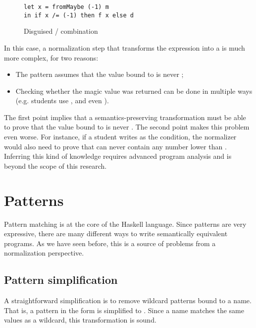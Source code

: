 \begin{figure}
\centering
\begin{verbatim}
let x = fromMaybe (-1) m
in if x /= (-1) then f x else d
\end{verbatim}
\caption{Disguised  /  combination}
\label{fig:maybe-isjust-fromjust-disguised}
\end{figure}

In this case, a normalization step that transforms the expression into a  is much more complex, for two reasons:

\begin{itemize}
    \item The pattern assumes that the value bound to  is never ;
    \item Checking whether the magic value was returned can be done in multiple ways (e.g. students use \haskell{(==)}, \haskell{(/=)} and even \haskell{(>)}).
\end{itemize}

The first point implies that a semantics-preserving transformation must be able to prove that the value bound to  is never . The second point makes this problem even worse. For instance, if a student writes  as the  condition, the normalizer would also need to prove that  can never contain any number lower than . Inferring this kind of knowledge requires advanced program analysis and is beyond the scope of this research.

\section{Patterns}

Pattern matching is at the core of the Haskell language. Since patterns are very expressive, there are many different ways to write semantically equivalent programs. As we have seen before, this is a source of problems from a normalization perspective.

\subsection{Pattern simplification}

A straightforward simplification is to remove wildcard patterns bound to a name. That is, a pattern in the form  is simplified to . Since a name matches the same values as a wildcard, this transformation is sound.

